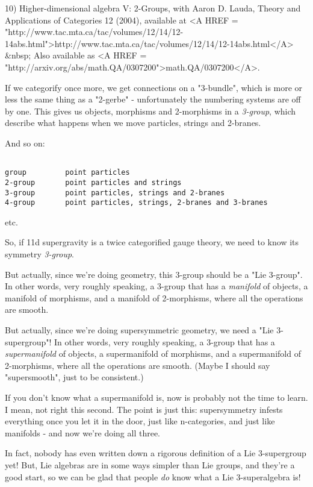 10) Higher-dimensional algebra V: 2-Groups, with Aaron D. Lauda, 
Theory and Applications of Categories 12 (2004), available at
<A HREF = "http://www.tac.mta.ca/tac/volumes/12/14/12-14abs.html">http://www.tac.mta.ca/tac/volumes/12/14/12-14abs.html</A> &nbsp;
Also available as <A HREF = "http://arxiv.org/abs/math.QA/0307200">math.QA/0307200</A>.

If we categorify once more, we get connections on a "3-bundle",
which is more or less the same thing as a "2-gerbe" - unfortunately
the numbering systems are off by one.   This gives us objects,
morphisms and 2-morphisms in a \emph{3-group}, which describe what 
happens when we move particles, strings and 2-branes.

And so on:


\begin{verbatim}

group         point particles
2-group       point particles and strings
3-group       point particles, strings and 2-branes
4-group       point particles, strings, 2-branes and 3-branes
\end{verbatim}
    
etc.  

So, if 11d supergravity is a twice categorified gauge theory,
we need to know its symmetry \emph{3-group}.  

But actually, since we're doing geometry, this 3-group should
be a "Lie 3-group".  In other words, very roughly speaking, 
a 3-group that has a \emph{manifold} of objects, a manifold of 
morphisms, and a manifold of 2-morphisms, where all the 
operations are smooth.

But actually, since we're doing supersymmetric geometry, we
need a "Lie 3-supergroup"!  In other words, very roughly
speaking, a 3-group that has a \emph{supermanifold} of objects, 
a supermanifold of morphisms, and a supermanifold of 2-morphisms, 
where all the operations are smooth.  (Maybe I should say 
"supersmooth", just to be consistent.)

If you don't know what a supermanifold is, now is probably 
not the time to learn.  I mean, not right this second.
The point is just this: supersymmetry 
infests everything once you let it in the door, just like 
n-categories, and just like manifolds - and now we're doing all three.   

In fact, nobody has even written down a rigorous definition
of a Lie 3-supergroup yet!  But, Lie algebras are in some ways 
simpler than Lie groups, and they're a good start, so we can
be glad that people \emph{do} know what a Lie 3-superalgebra is!

